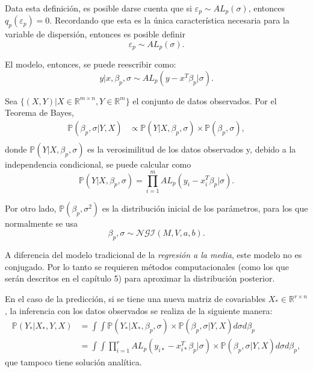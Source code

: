 Data esta definici\'on, es posible darse cuenta que si $\varepsilon_p \sim AL_p(\sigma)$, entonces $q_p(\varepsilon_p) = 0$. Recordando que esta es la \'unica caracter\'istica necesaria para la variable de dispersi\'on, entonces es posible definir
\begin{equation*}
    \varepsilon_p \sim AL_p(\sigma).
\end{equation*}

El modelo, entonces, se puede reescribir como:
\begin{equation*}
    y | x, \beta_p, \sigma 
    \sim 
    AL_p(y - x^T\beta_p|\sigma).
\end{equation*}

Sea $\{(X,Y) | X \in \mathbb{R}^{m \times n}, Y \in \mathbb{R}^m\}$ el conjunto de datos observados. Por el Teorema de Bayes,
\begin{equation*}
\begin{aligned}
    \mathbb{P}(\beta_p,\sigma | Y, X) 
    &\propto \mathbb{P}(Y| X, \beta_p, \sigma) \times \mathbb{P}(\beta_p, \sigma), \\
\end{aligned}
\end{equation*}
donde $\mathbb{P}(Y| X, \beta_p, \sigma)$ es la verosimilitud de los datos observados y, debido a la independencia condicional, se puede calcular como 
\begin{equation*}
    \mathbb{P}(Y| X, \beta_p, \sigma)
    =
    \prod_{i=1}^m AL_p(y_i - x_i^T\beta_p|\sigma).
\end{equation*}

Por otro lado, $\mathbb{P}(\beta_p,\sigma^2)$ es la distribuci\'on inicial de los par\'ametros, para los que normalmente se usa
\begin{equation*}
    \beta_p,\sigma \sim \mathcal{NGI}(M,V,a,b). 
\end{equation*}

A diferencia del modelo tradicional de la \textit{regresi\'on a la media}, este modelo no es conjugado. Por lo tanto se requieren m\'etodos computacionales (como los que ser\'an descritos en el cap\'itulo 5) para aproximar la distribuci\'on posterior.

En el caso de la predicci\'on, si se tiene una nueva matriz de covariables $X_* \in \mathbb{R}^{r \times n}$, la inferencia con los datos observados se realiza de la siguiente manera:
\begin{equation*}
\begin{aligned}
    \mathbb{P}(Y_*|X_*,Y,X)
    &= \int \int \mathbb{P}(Y_*|X_*,\beta_p,\sigma) \times \mathbb{P}(\beta_p,\sigma|Y,X) d\sigma d\beta_p \\
    &= \int \int \prod_{i=1}^r AL_p(y_{i*} - x_{i*}^T\beta_p|\sigma) \times \mathbb{P}(\beta_p,\sigma|Y,X) d\sigma d\beta_p,
\end{aligned}
\end{equation*}
que tampoco tiene soluci\'on anal\'itica.

